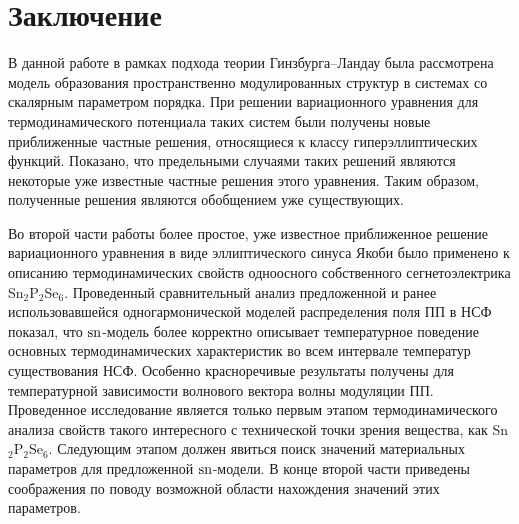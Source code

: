 
\chapter{Заключение}\label{ch-outro}

В данной работе в рамках подхода теории Гинзбурга--Ландау была рассмотрена модель образования пространственно модулированных структур в системах со скалярным параметром порядка.
При решении вариационного уравнения для термодинамического потенциала таких систем были получены новые приближенные частные решения, относящиеся к классу гиперэллиптических функций.
Показано, что предельными случаями таких решений являются некоторые уже известные частные решения этого уравнения.
Таким образом, полученные решения являются обобщением уже существующих.

Во второй части работы более простое, уже известное приближенное решение вариационного уравнения в виде эллиптического синуса Якоби было применено к описанию термодинамических свойств одноосного собственного сегнетоэлектрика Sn$_2$P$_2$Se$_6$.
Проведенный сравнительный анализ предложенной и ранее использовавшейся одногармонической моделей распределения поля ПП в НСФ показал, что $\operatorname{sn}$-модель более корректно описывает температурное поведение основных термодинамических характеристик во всем интервале температур существования НСФ.
Особенно красноречивые результаты получены для температурной зависимости волнового вектора волны модуляции ПП.
Проведенное исследование является только первым этапом термодинамического анализа свойств такого интересного с технической точки зрения вещества, как Sn$_2$P$_2$Se$_6$.
Следующим этапом должен явиться поиск значений материальных параметров для предложенной $\operatorname{sn}$-модели.
В конце второй части приведены соображения по поводу возможной области нахождения значений этих параметров.
